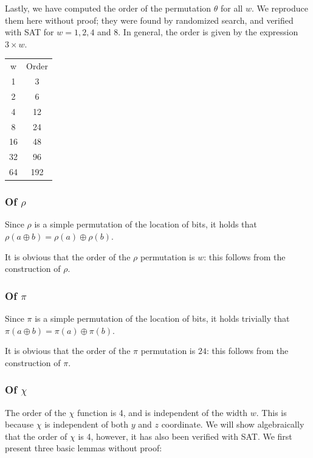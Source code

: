 \documentclass[10pt,twocolumn,twoside]{pnas-new}
\begin{document}
Lastly, we have computed the order of the permutation $\theta$ for all $w$.
We reproduce them here without proof; they were found by randomized search, and
verified with SAT for $w = 1, 2, 4$ and $8$. In general, the order is given by
the expression $3 \times w$.

\begin{tabular}{c c} \label{tab:p:t:1}
    w & Order \\
    1 & 3 \\
    2 & 6 \\
    4 & 12 \\
    8 & 24 \\
    16 & 48 \\
    32 & 96 \\
    64 & 192 \\
\end{tabular}


\subsubsection{Of $\rho$} \label{sec:p:r}


Since $\rho$ is a simple permutation of the location of bits, it holds that
$\rho(a \oplus b) = \rho(a) \oplus \rho(b)$.

It is obvious that the order of the $\rho$ permutation is $w$: this follows
from the construction of $\rho$.

\subsubsection{Of $\pi$} \label{sec:p:p}


Since $\pi$ is a simple permutation of the location of bits, it holds trivially
that $\pi(a \oplus b) = \pi(a) \oplus \pi(b)$.

It is obvious that the order of the $\pi$ permutation is $24$: this follows
from the construction of $\pi$.

\subsubsection{Of $\chi$} \label{sec:p:c}


The order of the $\chi$ function is 4, and is independent of the width
$w$. This is because $\chi$ is independent of both $y$ and $z$ coordinate.
We will show algebraically that the order of $\chi$ is 4, however, it has also
been verified with SAT. We first present three basic lemmas without proof:
\end{document}
